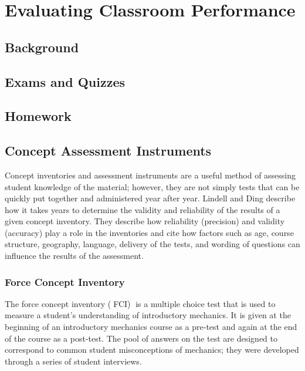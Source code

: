 \chapter[Chapter 4: Evaluating Classroom Performance]{Evaluating Classroom Performance}

\section{Background}

\section{Exams and Quizzes}

\section{Homework}

\section{Concept Assessment Instruments}

Concept inventories and assessment instruments are a useful method of assessing student knowledge of the material; however, they are not simply tests that can be quickly put together and administered year after year. Lindell and Ding describe how it takes years to determine the validity and reliability of the results of a given concept inventory. They describe how reliability (precision) and validity (accuracy) play a role in the inventories and cite how factors such as age, course structure, geography, language, delivery of the tests, and wording of questions can influence the results of the assessment\cite{lindell2012}.

\subsection{Force Concept Inventory}

The force concept inventory (􏰀FCI)􏰁 is a multiple choice test that is used to measure a student's understanding of introductory mechanics. It is given at the beginning of an introductory mechanics course as a pre-test and again at the end of the course as a post-test. The pool of answers on the test are designed to correspond to common student misconceptions of mechanics; they were developed through a series of student interviews\cite{hestenes1992}.

